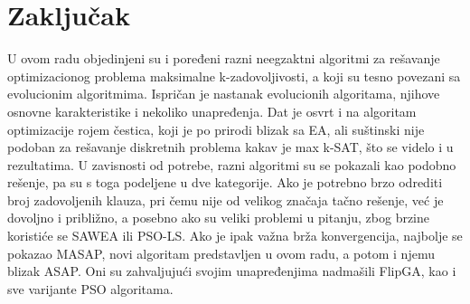 \documentclass[a4paper]{article}
\begin{document}
\section{Zaključak}
\label{sec:zakljucak}
U ovom radu objedinjeni su i poređeni razni neegzaktni algoritmi za rešavanje 
optimizacionog problema maksimalne k-zadovoljivosti, 
a koji su tesno povezani sa evolucionim algoritmima. Ispričan je nastanak 
evolucionih algoritama, njihove osnovne karakteristike i nekoliko unapređenja. 
Dat je osvrt i na algoritam optimizacije rojem čestica, koji je po prirodi blizak sa EA,
ali suštinski nije podoban za rešavanje diskretnih problema kakav je max k-SAT, 
što se videlo i u rezultatima. U zavisnosti od potrebe, razni algoritmi su se pokazali
kao podobno rešenje, pa su s toga podeljene u dve kategorije.
Ako je potrebno brzo odrediti broj zadovoljenih klauza,
pri čemu nije od velikog značaja tačno rešenje, već je dovoljno i približno,
a posebno ako su veliki problemi u pitanju, zbog brzine koristiće se SAWEA ili PSO-LS.
Ako je ipak važna brža konvergencija, najbolje se pokazao MASAP, novi algoritam 
predstavljen u ovom radu, a potom i njemu blizak ASAP. 
Oni su zahvaljujući svojim unapređenjima nadmašili FlipGA, 
kao i sve varijante PSO algoritama.



\appendix
\newpage
 

\end{document}
